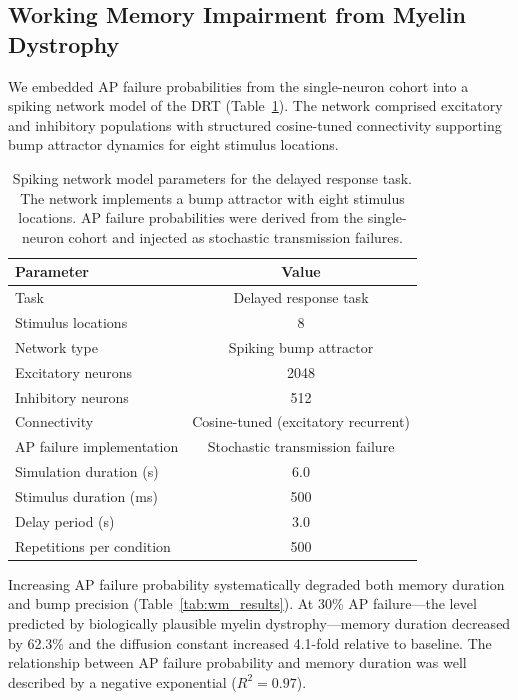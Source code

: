 \documentclass[11pt]{article}
\begin{document}
\subsection{Working Memory Impairment from Myelin Dystrophy}

We embedded AP failure probabilities from the single-neuron cohort into a spiking network model of the DRT (Table~\ref{tab:network_spec}). The network comprised excitatory and inhibitory populations with structured cosine-tuned connectivity supporting bump attractor dynamics for eight stimulus locations.

\begin{table}[H]
\centering
\caption{Spiking network model parameters for the delayed response task. The network implements a bump attractor with eight stimulus locations. AP failure probabilities were derived from the single-neuron cohort and injected as stochastic transmission failures.}
\label{tab:network_spec}
\begin{tabular}{lc}
\toprule
\textbf{Parameter} & \textbf{Value} \\
\midrule
Task & Delayed response task \\
Stimulus locations & 8 \\
Network type & Spiking bump attractor \\
Excitatory neurons & 2048 \\
Inhibitory neurons & 512 \\
Connectivity & Cosine-tuned (excitatory recurrent) \\
AP failure implementation & Stochastic transmission failure \\
Simulation duration (s) & 6.0 \\
Stimulus duration (ms) & 500 \\
Delay period (s) & 3.0 \\
Repetitions per condition & 500 \\
\bottomrule
\end{tabular}
\end{table}

Increasing AP failure probability systematically degraded both memory duration and bump precision (Table~\ref{tab:wm_results}). At 30\% AP failure---the level predicted by biologically plausible myelin dystrophy---memory duration decreased by 62.3\% and the diffusion constant increased 4.1-fold relative to baseline. The relationship between AP failure probability and memory duration was well described by a negative exponential ($R^2 = 0.97$).
\end{document}
